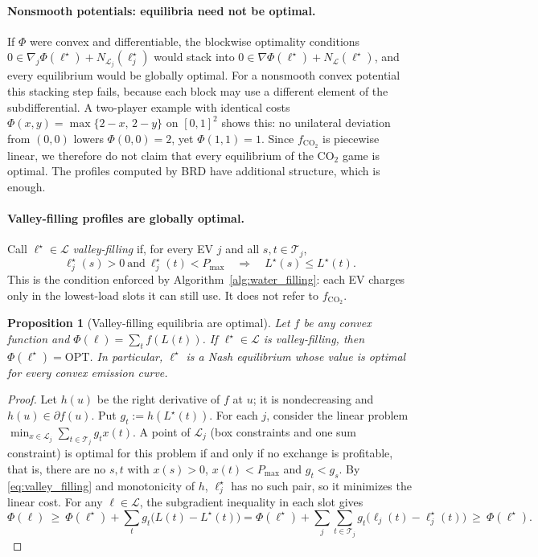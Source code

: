 \documentclass[11pt]{article}
\newtheorem{proposition}{Proposition}
\begin{document}
\paragraph{Nonsmooth potentials: equilibria need not be optimal.}
If $\Phi$ were convex and differentiable, the blockwise optimality conditions $0\in\nabla_j\Phi(\ell^\star)+N_{\mathcal L_j}(\ell^\star_j)$ would stack into $0\in\nabla\Phi(\ell^\star)+N_{\mathcal L}(\ell^\star)$, and every equilibrium would be globally optimal. For a nonsmooth convex potential this stacking step fails, because each block may use a different element of the subdifferential. A two-player example with identical costs $\Phi(x,y)=\max\{2-x,\,2-y\}$ on $[0,1]^2$ shows this: no unilateral deviation from $(0,0)$ lowers $\Phi(0,0)=2$, yet $\Phi(1,1)=1$. Since $f_{\mathrm{CO}_2}$ is piecewise linear, we therefore do not claim that every equilibrium of the CO$_2$ game is optimal. The profiles computed by BRD have additional structure, which is enough.

\paragraph{Valley-filling profiles are globally optimal.}
Call $\ell^\star\in\mathcal L$ \emph{valley-filling} if, for every EV $j$ and all $s,t\in\mathcal T_j$,
\begin{equation}
\label{eq:valley_filling}
\ell^\star_j(s)>0\ \text{and}\ \ell^\star_j(t)<P_{\max}
\quad\Longrightarrow\quad
L^\star(s)\le L^\star(t).
\end{equation}
This is the condition enforced by Algorithm~\ref{alg:water_filling}: each EV charges only in the lowest-load slots it can still use. It does not refer to $f_{\mathrm{CO}_2}$.

\begin{proposition}[Valley-filling equilibria are optimal]
\label{prop:valley_opt}
Let $f$ be any convex function and $\Phi(\ell)=\sum_t f(L(t))$. If $\ell^\star\in\mathcal L$ is valley-filling, then $\Phi(\ell^\star)=\mathrm{OPT}$. In particular, $\ell^\star$ is a Nash equilibrium whose value is optimal for every convex emission curve.
\end{proposition}

\begin{proof}
Let $h(u)$ be the right derivative of $f$ at $u$; it is nondecreasing and $h(u)\in\partial f(u)$. Put $g_t:=h(L^\star(t))$. For each $j$, consider the linear problem $\min_{x\in\mathcal L_j}\sum_{t\in\mathcal T_j}g_tx(t)$. A point of $\mathcal L_j$ (box constraints and one sum constraint) is optimal for this problem if and only if no exchange is profitable, that is, there are no $s,t$ with $x(s)>0$, $x(t)<P_{\max}$ and $g_t<g_s$. By \eqref{eq:valley_filling} and monotonicity of $h$, $\ell^\star_j$ has no such pair, so it minimizes the linear cost. For any $\ell\in\mathcal L$, the subgradient inequality in each slot gives
\[
\Phi(\ell)\ \ge\ \Phi(\ell^\star)+\sum_t g_t\bigl(L(t)-L^\star(t)\bigr)
=\Phi(\ell^\star)+\sum_j\sum_{t\in\mathcal T_j}g_t\bigl(\ell_j(t)-\ell^\star_j(t)\bigr)
\ \ge\ \Phi(\ell^\star).
\]
\end{proof}
\end{document}
